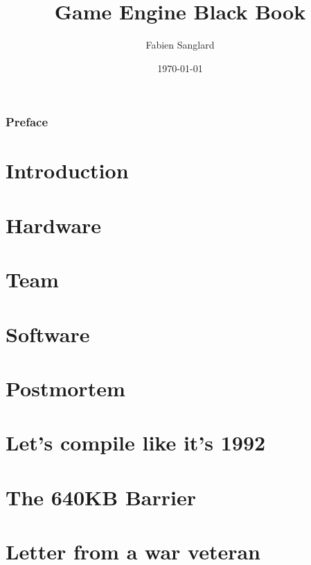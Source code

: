 \documentclass[10pt]{book}
\begin{document}
    \title{Game Engine Black Book}
    \author{Fabien Sanglard}
    \date{\today }
    \maketitle
    \tableofcontents
    \listoffigures
    \listoftables
    
    \pagebreak
    \subsection*{Preface}
      

    \chapter{Introduction}
    \chapter{Hardware}
      
    \chapter{Team}
      
    \chapter{Software}
    \chapter{Postmortem}
    \appendix
    \chapter{Let's compile like it's 1992}
    \chapter{The 640KB Barrier}
    \chapter{Letter from a war veteran}
\end{document}
